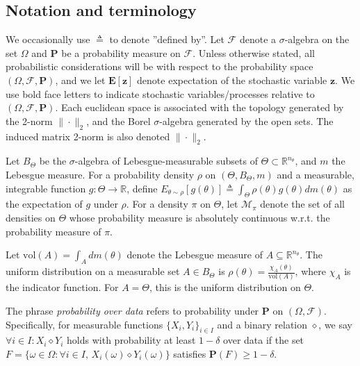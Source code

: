 \documentclass{article}
\newcommand{\z}{\mathbf{z}}
\newcommand{\bP}{\mathbf{P}}
\newcommand{\bE}{\mathbf{E}}
\newcommand{\F}{\mathcal{F}}
\begin{document}
\subsection{ Notation and terminology} 
We occasionally use $\triangleq$ to denote ''defined by''. 
Let $\F$ denote a $\sigma$-algebra on the set $\Omega$ and $\bP$ be a probability measure on $\F$. Unless otherwise stated, all probabilistic considerations will be with respect to the probability space $(\Omega,\F,\bP)$, and we let $\bE[\z]$ denote expectation of the stochastic variable $\z$.
We use bold face letters to indicate stochastic variables/processes relative to $(\Omega,\F,\bP)$. 
Each euclidean space is associated with the topology generated by the 2-norm $\|\cdot\|_2$, and the Borel $\sigma$-algebra generated by the open sets. The induced matrix 2-norm is also denoted $\|\cdot\|_2$. 
\par
Let $B_{\Theta}$ be the $\sigma$-algebra of Lebesgue-measurable subsets of $\Theta \subset \mathbb{R}^{n_\theta}$, and $m$ the Lebesgue measure. For a probability density $\rho$ on $(\Theta, B_{\Theta}, m)$ and a measurable, integrable function $g:\Theta \to \mathbb{R}$, define
\(
E_{\theta \sim \rho}[g(\theta)] \triangleq \int_{\Theta} \rho(\theta) g(\theta) dm(\theta)
\)
as the expectation of $g$ under $\rho$. For a density $\pi$ on $\Theta$, let $\mathcal{M}_{\pi}$ denote the set of all densities on $\Theta$ %
whose probability measure  is absolutely continuous w.r.t. the probability measure of $\pi$. 
\par
Let $\mathrm{vol}(A) = \int_{A} dm(\theta)$ denote the Lebesgue measure of $A \subseteq \mathbb{R}^{n_\theta}$. The uniform distribution on a measurable set $A \in B_\Theta$ is $\rho(\theta) = \frac{\chi_A(\theta)}{\mathrm{vol}(A)}$, where $\chi_A$ is the indicator function. For $A = \Theta$, this is the uniform distribution on $\Theta$.
\par
The phrase \emph{probability over data} refers to probability under $\bP$ on $(\Omega, \F)$. Specifically, for measurable functions $\{X_i, Y_i\}_{i \in I}$ and a binary relation $\diamond$, we say $\forall i \in I: X_i \diamond Y_i$ holds with probability at least $1-\delta$ over data if the set $F = \{\omega \in \Omega : \forall i \in I,\, X_i(\omega) \diamond Y_i(\omega)\}$ satisfies $\bP(F) \ge 1-\delta$.
\end{document}
